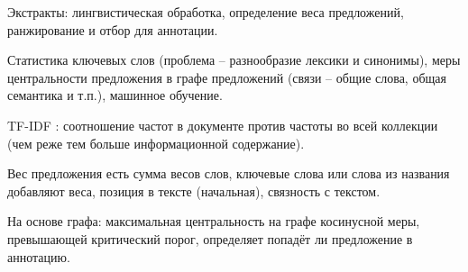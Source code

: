 \documentclass[a4paper]{article}
\begin{document}
Экстракты: лингвистическая обработка, определение веса предложений, ранжирование и отбор для аннотации.

Статистика ключевых слов (проблема -- разнообразие лексики и синонимы), меры центральности предложения в графе предложений (связи -- общие слова, общая семантика и т.п.), машинное обучение.

TF-IDF : соотношение частот в документе против частоты во всей коллекции (чем реже тем больше информационной содержание).

Вес предложения есть сумма весов слов, ключевые слова или слова из названия добавляют веса, позиция в тексте (начальная), связность с текстом.

На основе графа: максимальная центральность на графе косинусной меры, превышающей критический порог, определяет попадёт ли предложение в аннотацию.

\end{document}
